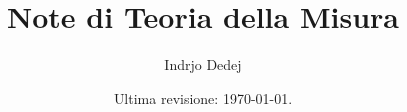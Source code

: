 


\title{Note di Teoria della Misura}
\author{Indrjo Dedej}
\date{Ultima revisione: \today{}.}
\makeindex[title=Indice Analitico, intoc=true]



\maketitle

\tableofcontents








\printindex


